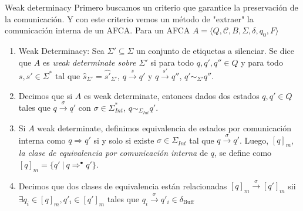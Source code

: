 \documentclass[10pt,xcolor={table,dvipsnames},t]{beamer}
\begin{document}
\begin{frame}{Weak determinacy}
Primero buscamos un criterio que garantice la preservación de la comunicación. Y con este criterio vemos un método de "extraer" la comunicación interna de un AFCA. Para un AFCA $A= \langle Q, \mathcal{C}, B, \Sigma, \delta, q_0, F \rangle$

\begin{enumerate}
    \item Weak Determinacy: Sea $\Sigma' \subseteq \Sigma$ un conjunto de etiquetas a silenciar. Se dice que $A$ es \emph{weak determinate sobre $\Sigma'$} si para todo $q, q', q'' \in Q$ y para todo $s, s' \in \Sigma^*$ tal que $\widehat{s}_{\Sigma'} = \widehat{s'}_{\Sigma'}$, $q \xrightarrow{s} q'$ y $q \xrightarrow{s'} q''$, $q' \sim_{\Sigma'} q''$.\\

    \item Decimos que si $A$ es weak determinate, entonces dados dos estados $q, q' \in Q$ tales que $q \xrightarrow{\sigma} q'$ con $\sigma \in \Sigma_{\mathit{Int}}^*$,  $q \sim_{\Sigma_\mathit{Int}} q'$.
    
    \item Si $A$ weak determinate, definimos equivalencia de estados por comunicación interna como $q \Rightarrow q'$ si y solo si existe $\sigma \in \Sigma_\mathit{Int}$ tal que $q \xrightarrow{\sigma} q'$. Luego, $[q]_m$, \emph{la clase de equivalencia por comunicación interna} de $q$, se define como $[q]_m = \{q'\ |\ q \Rightarrow^\bullet q'\}$. 
    
    \item Decimos que dos clases de equivalencia están relacionadas $[q]_m \xrightarrow{\sigma} [q']_m$ sii $\exists q_i \in [q]_m, q'_i \in [q']_m$ tales que $q_i \xrightarrow{\sigma} q'_i \in \delta_{\text{Buff}}$
\end{enumerate}
\end{frame}
\end{document}
